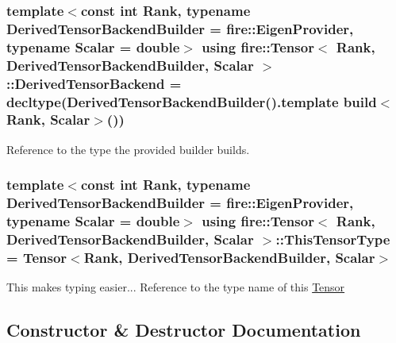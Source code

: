 \subsubsection[{\texorpdfstring{Derived\+Tensor\+Backend}{DerivedTensorBackend}}]{\setlength{\rightskip}{0pt plus 5cm}template$<$const int Rank, typename Derived\+Tensor\+Backend\+Builder = fire\+::\+Eigen\+Provider, typename Scalar = double$>$ using {\bf fire\+::\+Tensor}$<$ Rank, Derived\+Tensor\+Backend\+Builder, Scalar $>$\+::{\bf Derived\+Tensor\+Backend} =  decltype(Derived\+Tensor\+Backend\+Builder().template {\bf build}$<$Rank, Scalar$>$())\hspace{0.3cm}{\ttfamily [protected]}}\hypertarget{a00299_a2bee8cbb535647595a650d9a48edb509}{}\label{a00299_a2bee8cbb535647595a650d9a48edb509}
Reference to the type the provided builder builds. 
\subsubsection[{\texorpdfstring{This\+Tensor\+Type}{ThisTensorType}}]{\setlength{\rightskip}{0pt plus 5cm}template$<$const int Rank, typename Derived\+Tensor\+Backend\+Builder = fire\+::\+Eigen\+Provider, typename Scalar = double$>$ using {\bf fire\+::\+Tensor}$<$ Rank, Derived\+Tensor\+Backend\+Builder, Scalar $>$\+::{\bf This\+Tensor\+Type} =  {\bf Tensor}$<$Rank, Derived\+Tensor\+Backend\+Builder, Scalar$>$\hspace{0.3cm}{\ttfamily [protected]}}\hypertarget{a00299_ac86105ceb5e209854b2554a755024bd4}{}\label{a00299_ac86105ceb5e209854b2554a755024bd4}
This makes typing easier... Reference to the type name of this \hyperlink{a00299}{Tensor} 

\subsection{Constructor \& Destructor Documentation}
